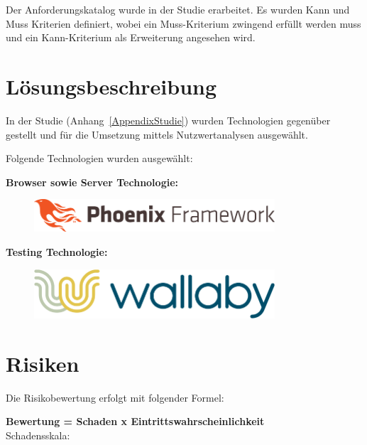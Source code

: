 Der Anforderungskatalog wurde in der Studie erarbeitet. Es wurden Kann und Muss
Kriterien definiert, wobei ein Muss-Kriterium zwingend erfüllt werden muss und
ein Kann-Kriterium als Erweiterung angesehen wird.



\clearpage
\section{Lösungsbeschreibung}\label{loesungsbeschreibung}

In der Studie (Anhang~\ref{AppendixStudie}) wurden Technologien gegenüber
gestellt und für die Umsetzung mittels Nutzwertanalysen ausgewählt.

Folgende Technologien wurden ausgewählt:

\textbf{Browser sowie Server Technologie:}

\begin{figure}[!htb]
  \centering
  \includegraphics[width=0.8\textwidth]{figures/phoenix.png}
\end{figure}

\textbf{Testing Technologie:}

\begin{figure}[!htb]
  \centering
  \includegraphics[width=0.8\textwidth]{figures/wallaby.png}
\end{figure}

\clearpage
\section{Risiken}\label{risiken}

Die Risikobewertung erfolgt mit folgender Formel:

\textbf{Bewertung = Schaden x Eintrittswahrscheinlichkeit}\\

Schadensskala:

